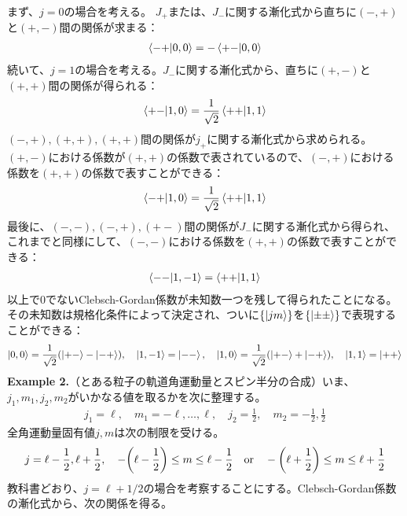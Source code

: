 \documentclass[dvipdfmx]{jarticle}
\theoremstyle{plain}
\begin{document}
\begin{enumerate}
        まず、$j = 0$の場合を考える。 $J_+$または、$J_-$に関する漸化式から直ちに$(-,+)$と$(+,-)$間の関係が求まる：
        \begin{align}
          \bra{-+}\ket{0,0} = - \bra{+-}\ket{0, 0}
        \end{align}
        続いて、$j = 1$の場合を考える。$J_-$に関する漸化式から、直ちに$(+,-)$と$(+, +)$間の関係が得られる：
        \begin{align}
          \bra{+-}\ket{1,0} = \frac{1}{\sqrt{2}}\bra{++}\ket{1, 1}
        \end{align}
        $(-,+),(+,+),(+,+)$間の関係が$j_+$に関する漸化式から求められる。$(+,-)$における係数が$(+,+)$の係数で表されているので、$(-,+)$における係数を$(+,+)$の係数で表すことができる：
        \begin{align}
          \bra{-+}\ket{1,0} = \frac{1}{\sqrt{2}}\bra{++}\ket{1,1}
        \end{align}
        最後に、$(-,-),(-,+),(+-)$間の関係が$J_-$に関する漸化式から得られ、これまでと同様にして、$(-,-)$における係数を$(+,+)$の係数で表すことができる：
        \begin{align}
          \bra{--}\ket{1,-1} = \bra{++}\ket{1,1}
        \end{align}
        以上で0でないClebsch-Gordan係数が未知数一つを残して得られたことになる。その未知数は規格化条件によって決定され、ついに$\qty{\ket{jm}}$を$\qty{\ket{\pm\pm}}$で表現することができる：
        \begin{gather}
          \ket{0, 0} = \frac{1}{\sqrt{2}}\qty(\ket{+-} - \ket{-+}), \quad 
          \ket{1, -1} = \ket{--}, \quad \ket{1, 0} = \frac{1}{\sqrt{2}}\qty(\ket{+-} + \ket{-+}), \quad \ket{1,1} = \ket{++}
        \end{gather}
        \textbf{Example 2.}（とある粒子の軌道角運動量とスピン半分の合成）いま、$j_1, m_1, j_2, m_2$がいかなる値を取るかを次に整理する。
        \begin{align}
          j_1 = \ell, \quad m_1 = -\ell, \dots , \ell, \quad j_2 = \frac{1}{2}, \quad m_2 = -\frac{1}{2}, \frac{1}{2}
        \end{align}
        全角運動量固有値$j, m$は次の制限を受ける。
        \begin{gather}
          j = \ell - \frac{1}{2}, \ell + \frac{1}{2}, \quad
          -\qty(\ell - \frac{1}{2}) \leq m \leq \ell - \frac{1}{2} \quad \mathrm{or} \quad -\qty(\ell + \frac{1}{2}) \leq m \leq \ell + \frac{1}{2}
        \end{gather}
        教科書どおり、$j = \ell + 1/2$の場合を考察することにする。Clebsch-Gordan係数の漸化式から、次の関係を得る。

\end{enumerate}
\end{document}
